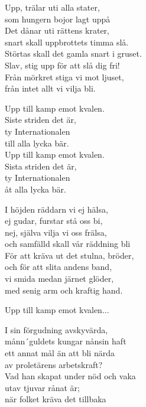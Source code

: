 \par
\vspace{10pt}
Upp, trälar uti alla stater,\\
som hungern bojor lagt uppå\\
Det dånar uti rättens krater,\\
snart skall uppbrottets timma slå.\\
Störtas skall det gamla snart i gruset.\\
Slav, stig upp för att slå dig fri!\\
Från mörkret stiga vi mot ljuset,\\
från intet allt vi vilja bli.\par
\vspace{10pt}
Upp till kamp emot kvalen.\\
Siste striden det är,\\
ty Internationalen\\
till alla lycka bär.\\
Upp till kamp emot kvalen.\\
Sista striden det är,\\
ty Internationalen\\
åt alla lycka bär.\par
\vspace{10pt}
I höjden räddarn vi ej hälsa,\\
ej gudar, furstar stå oss bi,\\
nej, själva vilja vi oss frälsa,\\
och samfälld skall vår räddning bli\\
För att kräva ut det stulna, bröder,\\
och för att slita andens band,\\
vi smida medan järnet glöder,\\
med senig arm och kraftig hand.\par
\vspace{10pt}
Upp till kamp emot kvalen...\par
\newpage
I sin förgudning avskyvärda,\\
månn´guldets kungar nånsin haft\\
ett annat mål än att bli närda\\
av proletärens arbetskraft?\\
Vad han skapat under nöd och vaka\\
utav tjuvar rånat är;\\
när folket kräva det tillbaka\\
